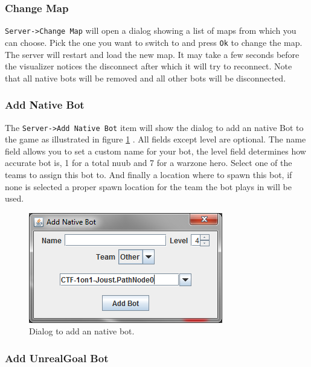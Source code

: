 \documentclass[11pt,a4paper]{article}
\begin{document}
\subsubsection*{Change Map}
\texttt{Server->Change Map} will open a dialog showing a list of maps from which you can choose. Pick the one you want to switch to and press \texttt{Ok} to change the map. The server will restart and load the new map. It may take a few seconds before the visualizer notices the disconnect after which it will try to reconnect. Note that all native bots will be removed and all other bots will be disconnected. 

\subsubsection*{Add Native Bot}


The \texttt{Server->Add Native Bot} item will show the dialog to add an native Bot to the game as illustrated in figure \ref{fig:add_native_bot} . All fields except level are optional. The name field allows you to set a custom name for your bot, the level field determines how accurate bot is, 1 for a total nuub and 7 for a warzone hero. Select one of the teams to assign this bot to. And finally a location where to spawn this bot, if none is selected a proper spawn location for the team the bot plays in will be used.

\begin{figure}[h!]
\centering
\includegraphics{images/add_native_bot.png}
\caption{Dialog to add an native bot.}\label{fig:add_native_bot}
\end{figure}


\subsubsection*{Add UnrealGoal Bot}
\end{document}
